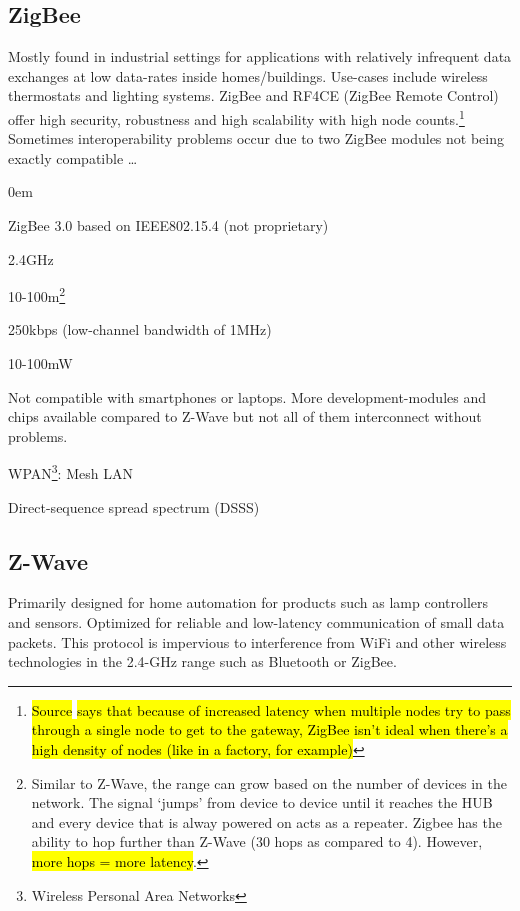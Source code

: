 \documentclass[11pt,a4paper,twoside]{article} %
\begin{document}
\subsection{ZigBee}
Mostly found in industrial settings for applications with relatively infrequent data exchanges at low data-rates inside homes/buildings. Use-cases include wireless thermostats and lighting systems. ZigBee and RF4CE (ZigBee Remote Control) offer high security, robustness and high scalability with high node counts.\footnote{\hl{Source} \cite{BTzigbee} \hl{says that because of increased latency when multiple nodes try to pass through a single node to get to the gateway, ZigBee isn't ideal when there's a high density of nodes (like in a factory, for example)}} Sometimes interoperability problems occur due to two ZigBee modules not being exactly compatible \dots
\vspace{-0.5cm}
\begin{description}
	\itemsep0em
	\item [Standard] ZigBee 3.0 based on IEEE802.15.4 (not proprietary)
	\item [Frequency] 2.4GHz
	\item [Range] 10-100m\footnote{Similar to Z-Wave, the range can grow based on the number of devices in the network. The signal `jumps' from device to device until it reaches the HUB and every device that is alway powered on acts as a repeater. Zigbee has the ability to hop further than Z-Wave (30 hops as compared to 4). However, \hl{more hops = more latency}.}
	\item [Bitrate] 250kbps (low-channel bandwidth of 1MHz)
	\item [Power Usage] 10-100mW
	\item [Infrastructure] Not compatible with smartphones or laptops. More development-modules and chips available compared to Z-Wave but not all of them interconnect without problems.
	\item [Network topology] WPAN\footnote{Wireless Personal Area Networks}: Mesh LAN
	\item [Modulation] Direct-sequence spread spectrum (DSSS)
\end{description}

\clearpage


\subsection{Z-Wave}
Primarily designed for home automation for products such as lamp controllers and sensors. Optimized for reliable and low-latency communication of small data packets. This protocol is impervious to interference from WiFi and other wireless technologies in the 2.4-GHz range such as Bluetooth or ZigBee.
\end{document}
